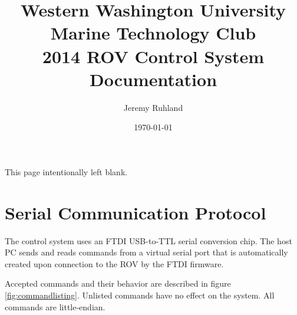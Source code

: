 \documentclass{article}
\title{Western Washington University Marine Technology Club\\2014 ROV Control System Documentation}
\author{Jeremy Ruhland}
\date{\today}
\begin{document}
\maketitle
\null
\pagebreak
\vspace*{\fill}
\hfill
\begin{center}
This page intentionally left blank.
\end{center}
\pagebreak

\section*{Serial Communication Protocol}
The control system uses an FTDI USB-to-TTL serial conversion chip. The host PC sends and reads commands from a virtual serial port that is automatically created upon connection to the ROV by the FTDI firmware.

Accepted commands and their behavior are described in figure \ref{fig:commandlisting}. Unlisted commands have no effect on the system. All commands are little-endian.
\end{document}
